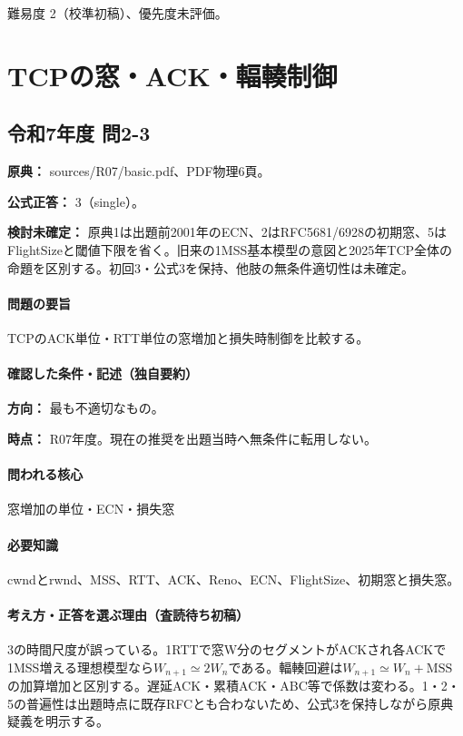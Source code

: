 \par 難易度 2（校準初稿）、優先度未評価。

\section{TCPの窓・ACK・輻輳制御}

\subsection{令和7年度 問2-3}
\label{q:r07-reg-basic-2-3}

\noindent\textbf{原典：} sources/R07/basic.pdf、PDF物理6頁。

\textbf{公式正答：} 3（single）。

\par\textbf{検討未確定：} 原典1は出題前2001年のECN、2はRFC5681/6928の初期窓、5はFlightSizeと閾値下限を省く。旧来の1MSS基本模型の意図と2025年TCP全体の命題を区別する。初回3・公式3を保持、他肢の無条件適切性は未確定。

\paragraph{問題の要旨} TCPのACK単位・RTT単位の窓増加と損失時制御を比較する。

\paragraph{確認した条件・記述（独自要約）}\mbox{}\par

\noindent\textbf{方向：} 最も不適切なもの。\par

\noindent\textbf{時点：} R07年度。現在の推奨を出題当時へ無条件に転用しない。\par

\paragraph{問われる核心} 窓増加の単位・ECN・損失窓

\paragraph{必要知識} cwndとrwnd、MSS、RTT、ACK、Reno、ECN、FlightSize、初期窓と損失窓。

\paragraph{考え方・正答を選ぶ理由（査読待ち初稿）} 3の時間尺度が誤っている。1RTTで窓W分のセグメントがACKされ各ACKで1MSS増える理想模型なら\(W_{n+1}\simeq2W_n\)である。輻輳回避は\(W_{n+1}\simeq W_n+\mathrm{MSS}\)の加算増加と区別する。遅延ACK・累積ACK・ABC等で係数は変わる。1・2・5の普遍性は出題時点に既存RFCとも合わないため、公式3を保持しながら原典疑義を明示する。

